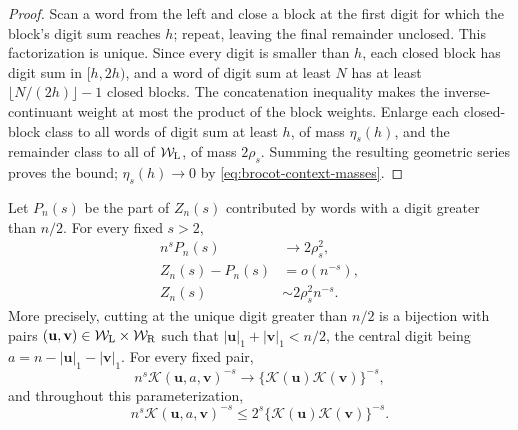 \begin{proof}
Scan a word from the left and close a block at the first digit for which the
block's digit sum reaches \(h\); repeat, leaving the final remainder
unclosed.  This factorization is unique.  Since every digit is smaller than
\(h\), each closed block has digit sum in \([h,2h)\), and a word of digit sum
at least \(N\) has at least \(\lfloor N/(2h)\rfloor-1\) closed blocks.
The concatenation inequality makes the inverse-continuant weight at most the
product of the block weights.  Enlarge each closed-block class to all words
of digit sum at least \(h\), of mass \(\eta_s(h)\), and the remainder class
to all of \(\mathcal W_{\rm L}\), of mass \(2\rho_s\).  Summing the resulting
geometric series proves the bound; \(\eta_s(h)\to0\) by
\eqref{eq:brocot-context-masses}.
\end{proof}

\begin{proposition}
\label{prop:brocot-context-estimates}
Let \(P_n(s)\) be the part of \(Z_n(s)\) contributed by words with a digit
greater than \(n/2\).  For every fixed \(s>2\),
\begin{align}
 n^sP_n(s)&\longrightarrow2\rho_s^2,
 \label{eq:principal-large-digit-limit}\\
 Z_n(s)-P_n(s)&=o(n^{-s}),
 \label{eq:noncondensed-negligible}\\
 Z_n(s)&\sim2\rho_s^2n^{-s}.
 \label{eq:brocot-partition-asymptotic}
\end{align}
More precisely, cutting at the unique digit greater than \(n/2\) is a
bijection with pairs
\((\mathbf u,\mathbf v)\in\mathcal W_{\rm L}\times\mathcal W_{\rm R}\)
such that \(|\mathbf u|_1+|\mathbf v|_1<n/2\), the central digit being
\(a=n-|\mathbf u|_1-|\mathbf v|_1\).  For every fixed pair,
\begin{equation}
 n^s\mathcal K(\mathbf u,a,\mathbf v)^{-s}
 \longrightarrow
 \{\mathcal K(\mathbf u)\mathcal K(\mathbf v)\}^{-s},
 \label{eq:fixed-context-limit}
\end{equation}
and throughout this parameterization,
\begin{equation}
 n^s\mathcal K(\mathbf u,a,\mathbf v)^{-s}
 \le2^s\{\mathcal K(\mathbf u)\mathcal K(\mathbf v)\}^{-s}.
 \label{eq:summable-context-domination}
\end{equation}
\end{proposition}

